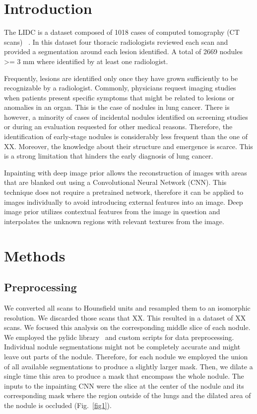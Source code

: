 \documentclass[runningheads]{llncs}
\begin{document}
\section{Introduction}
The LIDC is a dataset composed of 1018 cases of computed tomography (CT scans) ~\cite{pmid21452728}. In this dataset four thoracic radiologists reviewed each scan and provided a segmentation around each lesion identified. A total of 2669 nodules >= 3 mm where identified by at least one radiologist. 

Frequently, lesions are identified only once they have grown sufficiently to be recognizable by a radiologist. Commonly, physicians request imaging studies when patients present specific symptoms that might be related to lesions or anomalies in an organ. This is the case of nodules in lung cancer. There is however, a minority of cases of incidental nodules identified on screening studies or during an evaluation requested for other medical reasons. Therefore, the identification of early-stage nodules is considerably less frequent than the one of XX. Moreover, the knowledge about their structure and emergence is scarce. This is a strong limitation that hinders the early diagnosis of lung cancer.

Inpainting with deep image prior allows the reconstruction of images with areas that are blanked out using a Convolutional Neural Network (CNN). This technique does not require a pretrained network, therefore it can be applied to images individually to avoid introducing external features into an image. Deep image prior utilizes contextual features from the image in question and interpolates the unknown regions with relevant textures from the image\cite{DBLP:journals/corr/abs-1711-10925}. 

\section{Methods}
\subsection{Preprocessing}
We converted all scans to Hounsfield units and resampled them to an isomorphic resolution. We discarded those scans that XX. This resulted in a dataset of XX scans. We focused this analysis on the corresponding middle slice of each nodule. We employed the pylidc library~\cite{pylidc} and custom scripts for data preprocessing. Individual nodule segmentations might not be completely accurate and might leave out parts of the nodule. Therefore, for each nodule we employed the union of all available segmentations to produce a slightly larger mask. Then, we dilate a single time this area to produce a mask that encompass the whole nodule. The inputs to the inpainting CNN were the slice at the center of the nodule and its corresponding mask where the region outside of the lungs and the dilated area of the nodule is occluded (Fig.~\ref{fig1}).
\end{document}
